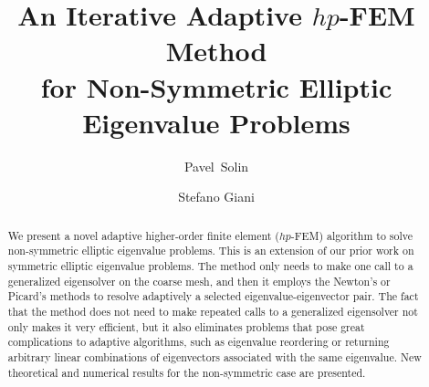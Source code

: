 \documentclass[smallextended]{svjour3}
\begin{document}
\title{An Iterative Adaptive $hp$-FEM Method\\ for Non-Symmetric Elliptic Eigenvalue Problems}

%

\author{Pavel~Solin \and Stefano Giani}





\date{}

\maketitle





\begin{abstract}
We present a novel adaptive higher-order finite element ($hp$-FEM) algorithm 
to solve non-symmetric elliptic eigenvalue problems. This is an extension of 
our prior work on symmetric elliptic eigenvalue problems. The method 
only needs to make one call to a generalized eigensolver on the coarse mesh, and 
then it employs the Newton's or Picard's methods to resolve adaptively 
a selected eigenvalue-eigenvector pair. The fact that the method does not need to make 
repeated calls to a generalized eigensolver not only makes it very 
efficient, but it also eliminates problems that 
pose great complications to adaptive algorithms, such as eigenvalue reordering 
or returning arbitrary linear combinations of eigenvectors associated with the same 
eigenvalue. New theoretical and numerical results for the non-symmetric case 
are presented.


\end{abstract}
\end{document}
